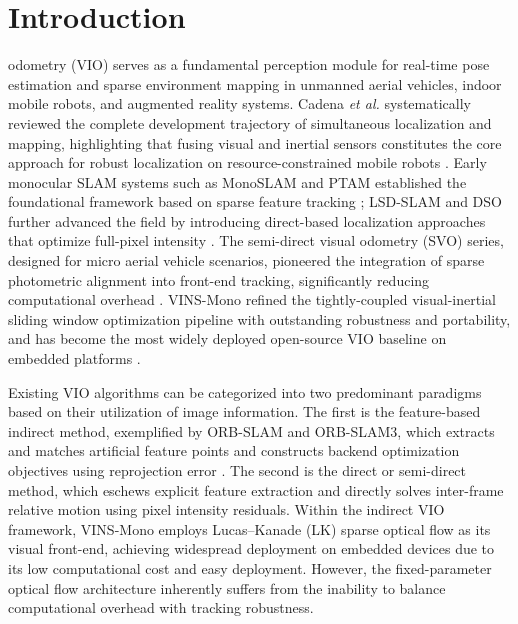 \documentclass[journal,twoside,web]{ieeecolor}
\begin{document}
\maketitle

\section{Introduction}
\label{sec:introduction}
 odometry (VIO) serves as a fundamental perception module for real-time pose estimation and sparse environment mapping in unmanned aerial vehicles, indoor mobile robots, and augmented reality systems. Cadena \emph{et al.} systematically reviewed the complete development trajectory of simultaneous localization and mapping, highlighting that fusing visual and inertial sensors constitutes the core approach for robust localization on resource-constrained mobile robots \cite{cadena2010past}. Early monocular SLAM systems such as MonoSLAM and PTAM established the foundational framework based on sparse feature tracking \cite{davison2007monoslam,klein2007ptam}; LSD-SLAM and DSO further advanced the field by introducing direct-based localization approaches that optimize full-pixel intensity \cite{engel2014lsd,engel2017dso}. The semi-direct visual odometry (SVO) series, designed for micro aerial vehicle scenarios, pioneered the integration of sparse photometric alignment into front-end tracking, significantly reducing computational overhead \cite{forster2014svo,forster2017svo}. VINS-Mono refined the tightly-coupled visual-inertial sliding window optimization pipeline with outstanding robustness and portability, and has become the most widely deployed open-source VIO baseline on embedded platforms \cite{qin2018vins}.

Existing VIO algorithms can be categorized into two predominant paradigms based on their utilization of image information. The first is the feature-based indirect method, exemplified by ORB-SLAM and ORB-SLAM3, which extracts and matches artificial feature points and constructs backend optimization objectives using reprojection error \cite{mur2015orb,campos2021orb}. The second is the direct or semi-direct method, which eschews explicit feature extraction and directly solves inter-frame relative motion using pixel intensity residuals. Within the indirect VIO framework, VINS-Mono employs Lucas--Kanade (LK) sparse optical flow as its visual front-end, achieving widespread deployment on embedded devices due to its low computational cost and easy deployment. However, the fixed-parameter optical flow architecture inherently suffers from the inability to balance computational overhead with tracking robustness.
\end{document}
